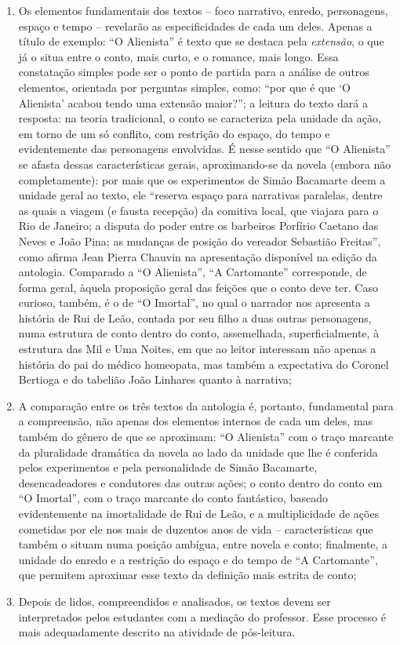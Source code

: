 \documentclass{extarticle}
\begin{document}
\begin{enumerate}
\item Os elementos fundamentais dos textos -- foco narrativo, enredo,
personagens, espaço e tempo -- revelarão as especificidades de cada um
deles. Apenas a título de exemplo: ``O Alienista'' é texto que se
destaca pela \emph{extensão}, o que já o situa entre o conto, mais
curto, e o romance, mais longo. Essa constatação simples pode ser o
ponto de partida para a análise de outros elementos, orientada por
perguntas simples, como: ``por que é que `O Alienista' acabou tendo uma
extensão maior?''; a leitura do texto dará a resposta: na teoria
tradicional, o conto se caracteriza pela unidade da ação, em torno de um
só conflito, com restrição do espaço, do tempo e evidentemente das
personagens envolvidas. É nesse sentido que ``O Alienista'' se afasta
dessas características gerais, aproximando-se da novela (embora não
completamente): por mais que os experimentos de Simão Bacamarte deem a
unidade geral ao texto, ele ``reserva espaço para narrativas paralelas,
dentre as quais a viagem (e fausta recepção) da comitiva local, que
viajara para o Rio de Janeiro; a disputa do poder entre os barbeiros
Porfírio Caetano das Neves e João Pina; as mudanças de posição do
vereador Sebastião Freitas'', como afirma Jean Pierra Chauvin na
apresentação disponível na edição da antologia. Comparado a ``O
Alienista'', ``A Cartomante'' corresponde, de forma geral, àquela
proposição geral das feições que o conto deve ter. Caso curioso, também,
é o de ``O Imortal'', no qual o narrador nos apresenta a história de Rui
de Leão, contada por seu filho a duas outras personagens, numa estrutura
de conto dentro do conto, assemelhada, superficialmente, à estrutura das
Mil e Uma Noites, em que ao leitor interessam não apenas a história do
pai do médico homeopata, mas também a expectativa do Coronel Bertioga e
do tabelião João Linhares quanto à narrativa;

\item A comparação entre os três textos da antologia é, portanto,
fundamental para a compreensão, não apenas dos elementos internos de
cada um deles, mas também do gênero de que se aproximam: ``O Alienista''
com o traço marcante da pluralidade dramática da novela ao lado da
unidade que lhe é conferida pelos experimentos e pela personalidade de
Simão Bacamarte, desencadeadores e condutores das outras ações; o conto
dentro do conto em ``O Imortal'', com o traço marcante do conto
fantástico, baseado evidentemente na imortalidade de Rui de Leão, e a
multiplicidade de ações cometidas por ele nos mais de duzentos anos de
vida -- características que também o situam numa posição ambígua, entre
novela e conto; finalmente, a unidade do enredo e a restrição do espaço
e do tempo de ``A Cartomante'', que permitem aproximar esse texto da
definição mais estrita de conto;

\item Depois de lidos, compreendidos e analisados, os textos devem ser
interpretados pelos estudantes com a mediação do professor. Esse
processo é mais adequadamente descrito na atividade de pós-leitura.
\end{enumerate}
\end{document}
